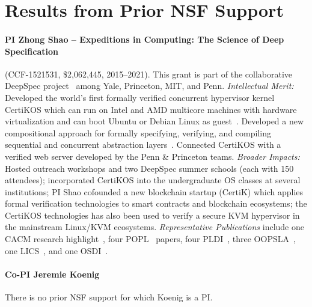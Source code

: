 \section{Results from Prior NSF Support}
\label{sec:prior}

\paragraph{PI Zhong Shao -- Expeditions in Computing: The Science of Deep Specification} (CCF-1521531, \$2,062,445, 2015--2021). 
This grant is part of the collaborative DeepSpec project~\cite{deepspec} among Yale, Princeton, MIT, and Penn. 
\emph{Intellectual Merit:} 
Developed the world's first formally verified
concurrent hypervisor kernel CertiKOS which can run on Intel and AMD
multicore machines with hardware virtualization and can boot Ubuntu or
Debian Linux as guest~\cite{certikos-osdi16}. Developed a
new compositional approach for formally specifying, verifying, and
compiling sequential and concurrent abstraction
layers~\cite{chen16,costanzo16,certikos-osdi16,ccal18,compcerto,wang2019,koenig20}.
Connected CertiKOS with a verified web server
developed by the Penn \& Princeton teams.
\emph{Broader Impacts:} 
Hosted outreach workshops and two DeepSpec summer schools (each with
150 attendees); incorporated CertiKOS into the undergraduate OS
classes at several institutions; PI Shao cofounded a new blockchain startup
(CertiK) which applies formal verification technologies to smart
contracts and blockchain ecosystems; the CertiKOS technologies has
also been used to verify a secure KVM hypervisor in the mainstream
Linux/KVM ecosystems.  {\em Representative Publications} include one
CACM research highlight~\cite{certikos-cacm19}, four
POPL~\cite{wang2019,liu-popl20,wang2022,layered22} papers, four
PLDI~\cite{chen16,costanzo16,ccal18,compcerto}, three
OOPSLA~\cite{deepsea19,compcertelf20,ado21}, one LICS~\cite{koenig20},
and one OSDI~\cite{certikos-osdi16}.

\vspace*{-2ex}
\paragraph{Co-PI Jeremie Koenig} 
There is no prior NSF support for which Koenig is a PI.

